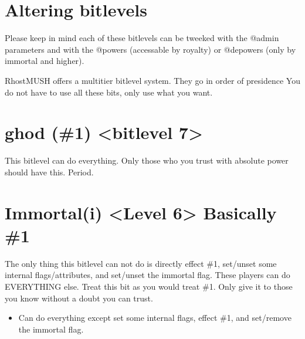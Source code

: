 \documentclass[letterpaper,10pt,english]{sphinxmanual}
\begin{document}
\section{Altering bitlevels}
\label{\detokenize{bitlevels:altering-bitlevels}}
\sphinxAtStartPar
Please keep in mind each of these bitlevels can be tweeked with the @admin
parameters and with the @powers (accessable by royalty) or @depowers (only
by immortal and higher).

\sphinxAtStartPar
RhostMUSH offers a multi\sphinxhyphen{}tier bitlevel system.  They go in order of presidence
You do not have to use all these bits, only use what you want.


\section{ghod (\#1) \textless{}bitlevel 7\textgreater{}}
\label{\detokenize{bitlevels:ghod-1-bitlevel-7}}
\sphinxAtStartPar
This bitlevel can do everything.  Only those who you trust with absolute power should have this.  Period.


\section{Immortal(i) \textless{}Level 6\textgreater{} \sphinxhyphen{} Basically \#1}
\label{\detokenize{bitlevels:immortal-i-level-6-basically-1}}
\sphinxAtStartPar
The only thing this bitlevel can not do is directly effect \#1,
set/unset some internal flags/attributes, and set/unset the
immortal flag.  These players can do EVERYTHING else.  Treat
this bit as you would treat \#1.  Only give it to those you know
without a doubt you can trust.
\begin{itemize}
\item {} 
\sphinxAtStartPar
Can do everything except set some internal flags, effect \#1, and set/remove the immortal flag.

\end{itemize}
\end{document}
